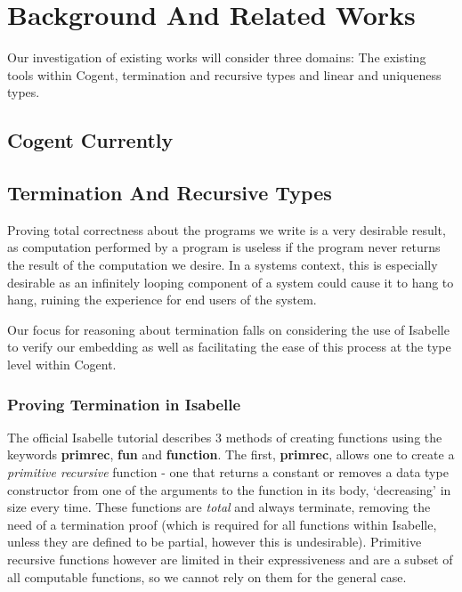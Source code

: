 \chapter{Background And Related Works}\label{ch:background}
Our investigation of existing works will consider three domains: The existing tools within Cogent,
termination and recursive types and linear and uniqueness types.

\section{Cogent Currently}

\section{Termination And Recursive Types}

Proving total correctness about the programs we write is a very desirable result,
as computation performed by a program is useless if the program never returns the
result of the computation we desire.
In a systems context, this is especially desirable as an infinitely looping component of a
system could cause it to hang to hang, ruining the experience for end users of the system.

Our focus for reasoning about termination falls on considering the use of Isabelle to verify our 
embedding as well as facilitating the ease of this process at the type level within Cogent. 

\subsection{Proving Termination in Isabelle}


The official Isabelle tutorial\citep{IsabelleTutorial} describes 3 methods of creating functions using the keywords 
\textbf{primrec}, \textbf{fun} and \textbf{function}. The first, \textbf{primrec}, allows one to create a 
\textit{primitive recursive} function - one that returns a constant or removes a data type constructor from one
of the arguments to the function in its body, `decreasing' in size every time. These functions are \textit{total}
and always terminate, removing the need of a termination proof (which is required for all functions within Isabelle,
unless they are defined to be partial, however this is undesirable).
Primitive recursive functions however are limited in their expressiveness and are a subset of all computable
functions, so we cannot rely on them for the general case.

